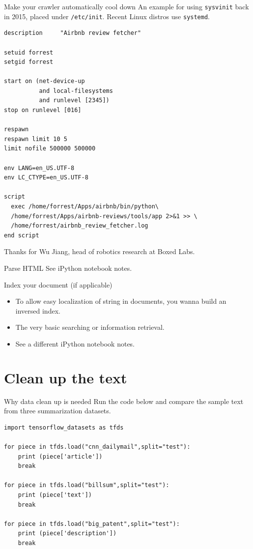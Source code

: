 \documentclass[11pt, handout]{beamer}
\begin{document}
\begin{frame}[fragile]{Make your crawler automatically cool down}
An example for using \texttt{sysvinit} back in 2015, placed under \texttt{/etc/init}. Recent Linux distros use \texttt{systemd}. 
\begin{block}{}
{\tiny
\begin{verbatim}
description     "Airbnb review fetcher"

setuid forrest
setgid forrest

start on (net-device-up
          and local-filesystems
          and runlevel [2345])
stop on runlevel [016]

respawn
respawn limit 10 5
limit nofile 500000 500000

env LANG=en_US.UTF-8
env LC_CTYPE=en_US.UTF-8

script
  exec /home/forrest/Apps/airbnb/bin/python\ 
  /home/forrest/Apps/airbnb-reviews/tools/app 2>&1 >> \
  /home/forrest/airbnb_review_fetcher.log
end script
\end{verbatim}
}
\end{block}

Thanks for Wu Jiang, head of robotics research at Boxed Labs. 
\end{frame}


\begin{frame}{Parse HTML}
See iPython notebook notes. 
\end{frame}

\begin{frame}{Index your document (if applicable)}
 \begin{itemize}
  \item To allow easy localization of string in documents, you wanna build an inversed index. 
  \item The very basic searching or information retrieval. 
  \item See a different iPython notebook notes. 
 \end{itemize}
\end{frame}

\section{Clean up the text}

\begin{frame}[fragile]{Why data clean up is needed}
Run the code below and compare the sample text from three summarization datasets. 
\scriptsize 
\begin{verbatim}
import tensorflow_datasets as tfds 

for piece in tfds.load("cnn_dailymail",split="test"): 
    print (piece['article']) 
    break 

for piece in tfds.load("billsum",split="test"): 
    print (piece['text']) 
    break 

for piece in tfds.load("big_patent",split="test"): 
    print (piece['description']) 
    break
\end{verbatim}
\end{frame}
\end{document}
